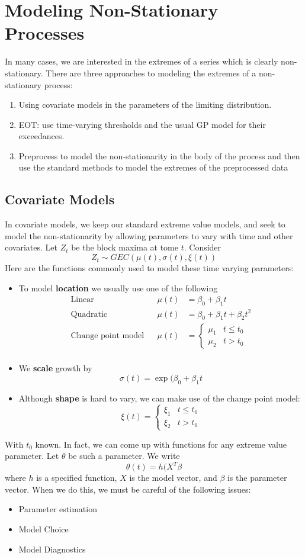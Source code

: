 \documentclass{article}
\theoremstyle{definition}
\theoremstyle{definition}
\begin{document}
\section{Modeling Non-Stationary Processes}
In many cases, we are interested in the extremes of
a series which is clearly non-stationary. There are three approaches to modeling the extremes of a non-stationary process:
\begin{enumerate}
    \item Using covariate models in the parameters of the
limiting distribution.
    \item EOT: use time-varying thresholds and the usual
GP model for their exceedances.
    \item Preprocess to model the non-stationarity in the
body of the process and then use the standard
methods to model the extremes of the preprocessed data
\end{enumerate}

\subsection{Covariate Models}
In covariate models, we keep our standard extreme value models, and seek to model the non-stationarity by
allowing parameters to vary with time and other
covariates. Let $Z_t$ be the block maxima at tome $t$. Consider
\[Z_t \sim GEC(\mu(t), \sigma(t), \xi(t))\]
Here are the functions commonly used to model these time varying parameters:
\begin{itemize}
    \item To model \textbf{location} we usually use one of the following
    \begin{align*}
        \text{Linear} &&\mu(t)&=\beta_0+\beta_1t \\
        \text{Quadratic} && \mu(t)&=\beta_0+\beta_1t+\beta_2t^2\\
        \text{Change point model} &&\mu(t)&=\begin{cases}\mu_1 & t\leq t_0\\ \mu_2 & t> t_0
        \end{cases}\\
    \end{align*}
    \item We \textbf{scale} growth by
    \[\sigma(t)= \exp(\beta_0+\beta_1t\]
    \item Although \textbf{shape} is hard to vary, we can make use of the change point model:
    \[\xi(t)=\begin{cases}\xi_1 & t\leq t_0\\ \xi_2 & t> t_0\end{cases}\]
\end{itemize}
With $t_0$ known. In fact, we can come up with functions for any extreme value parameter. Let $\theta$ be such a parameter. We write
\[\theta(t)= h(X^T\beta\]
where $h$ is a specified function, $X$ is the model vector, and $\beta $ is the parameter vector. When we do this, we must be careful of the following issues:
\begin{itemize}
    \item Parameter estimation
    \item Model Choice
    \item Model Diagnostics
\end{itemize}
\end{document}
